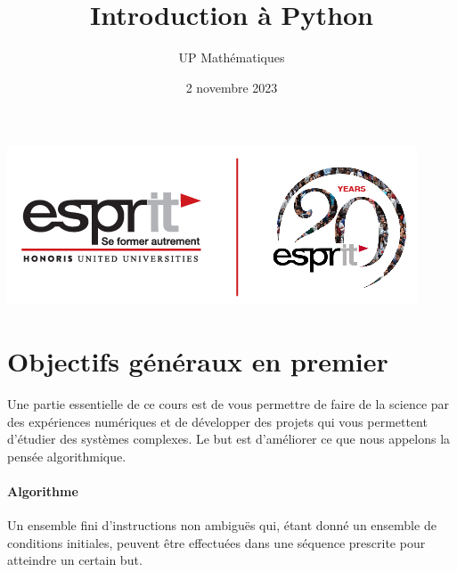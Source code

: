 \documentclass[%
oneside,                 %
final,                   %
10pt]{article}
\begin{document}

\newcommand{\exercisesection}[1]{\subsection*{#1}}






\title{Introduction à Python}


\author{UP Mathématiques}

\date{2 novembre 2023
}

\vspace{6mm}

\centerline{\includegraphics[width=0.45\linewidth]{imgs/Signature-01.jpg}}

\vspace{6mm}







\section{Objectifs généraux en premier}

Une partie essentielle de ce cours est de vous permettre de faire de la science par des expériences numériques et de développer des projets qui vous permettent d'étudier des systèmes complexes. Le but est d'améliorer ce que nous appelons la pensée algorithmique.

\paragraph{Algorithme}
Un ensemble fini d'instructions non ambiguës qui, étant donné un ensemble de conditions initiales, peuvent être effectuées dans une séquence prescrite pour atteindre un certain but.
\end{document}
